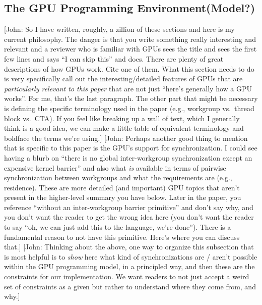 \documentclass[sigconf]{acmart}
\newcommand{\john}[1]{{\footnotesize\color{cyan}[John: #1]}}
\begin{document}
\subsection{The GPU Programming Environment(Model?)}
\john{So I have written, roughly, a zillion of these sections and here is my current philosophy. The danger is that you write something really interesting and relevant and a reviewer who is familiar with GPUs sees the title and sees the first few lines and says ``I can skip this'' and does. There are plenty of great descriptions of how GPUs work. Cite one of them. What this section needs to do is very specifically call out the interesting/detailed features of GPUs that are \emph{particularly relevant to this paper} that are not just ``here's generally how a GPU works''. For me, that's the last paragraph. The other part that might be necessary is defining the specific terminology used in the paper (e.g., workgroup vs.\ thread block vs.\ CTA). If you feel like breaking up a wall of text, which I generally think is a good idea, we can make a little table of equivalent terminology and boldface the terms we're using.} \john{Perhaps another good thing to mention that is specific to this paper is the GPU's support for synchronization. I could see having a blurb on ``there is no global inter-workgroup synchronization except an expensive kernel barrier'' and also what \emph{is} available in terms of pairwise synchronization between workgroups and what the requirements are (e.g., residence). These are more detailed (and important) GPU topics that aren't present in the higher-level summary you have below. Later in the paper, you reference ``without an inter-workgroup barrier primitive'' and don't say why, and you don't want the reader to get the wrong idea here (you don't want the reader to say ``oh, we can just add this to the language, we're done''). There is a fundamental reason to not have this primitive. Here's where you can discuss that.} \john{Thinking about the above, one way to organize this subsection that is most helpful is to \emph{show} here what kind of synchronizations are / aren't possible within the GPU programming model, in a principled way, and then these are the constraints for our implementation. We want readers to not just accept a weird set of constraints as a given but rather to understand where they come from, and why.}
\end{document}
